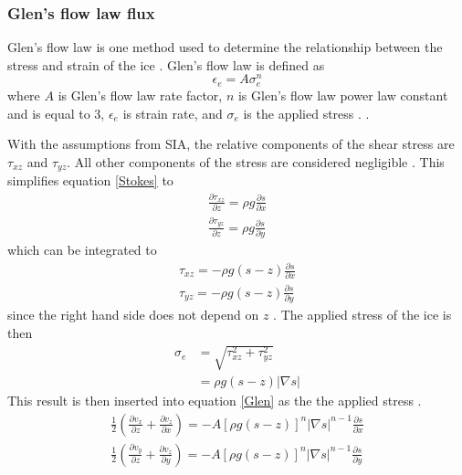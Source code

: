 \documentclass{article}
\begin{document}
\subsubsection{Glen's flow law flux}
Glen's flow law is one method used to determine the relationship between the stress and strain of the ice  \citep{AHLKRONA2016}. Glen's flow law is defined as
\begin{equation}\label{Glen}
\epsilon_e = A \sigma^n_e
\end{equation}
where $A$ is Glen’s flow law rate factor, $n$ is Glen’s flow law power law constant and is equal to 3, $\epsilon_e$ is strain rate, and $\sigma_e$ is the applied stress \citep{Hooke2013, Nye1952}. \citep{Jarosch2013, AHLKRONA2016}.

With the assumptions from SIA, the relative components of the shear stress are $\tau_{xz}$ and $\tau_{yz}$. All other components of the stress are considered negligible \citep{Greve2009}. This simplifies equation \ref{Stokes} to 
\begin{subequations}\label{horSIA}
\begin{gather}
    \frac{\partial \tau_{xz}}{\partial z} = \rho g \frac{\partial s}{\partial x} \\
    \frac{\partial \tau_{yz}}{\partial z} = \rho g \frac{\partial s}{\partial y}
\end{gather}
\end{subequations}
which can be integrated to
\begin{subequations}\label{horSIAint}
\begin{gather}
    \tau_{xz} = -\rho g(s-z) \frac{\partial s}{\partial x} \\
    \tau_{yz} = -\rho g(s-z) \frac{\partial s}{\partial y}
\end{gather}
\end{subequations}
since the right hand side does not depend on $z$ \citep{Greve2009}. The applied stress of the ice is then
\begin{align}
    \sigma_e &= \sqrt{\tau^2_{xz}+\tau^2_{yz}} \nonumber\\
     &= \rho g(s-z) |\nabla s| 
\end{align}
This result is then inserted into equation \ref{Glen} as the the applied stress \citep{Greve2009}. 
\begin{subequations}

\begin{gather}
   \frac{1}{2} \left(\frac{\partial v_x}{\partial z}+\frac{\partial v_z}{\partial x}\right) = -A[\rho g (s-z)]^n|\nabla s |^{n-1}\frac{\partial s}{\partial x} \\
    \frac{1}{2} \left(\frac{\partial v_y}{\partial z}+\frac{\partial v_z}{\partial y}\right)  = -A[\rho g (s-z)]^n|\nabla s |^{n-1}\frac{\partial s}{\partial y} 
\end{gather}
\end{subequations}
\end{document}
